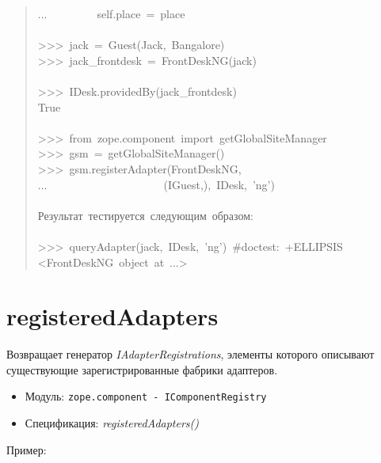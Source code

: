 \documentclass[a4paper,openany,twoside,final]{book}
\providecommand*{\DUroletitlereference}[1]{\textsl{#1}}
\begin{document}
\begin{quote}
{...~~~~~~~~~self.place~=~place\\
~\\
>{}>{}>~jack~=~Guest(\textquotedbl{}Jack\textquotedbl{},~\textquotedbl{}Bangalore\textquotedbl{})\\
>{}>{}>~jack\_frontdesk~=~FrontDeskNG(jack)\\
~\\
>{}>{}>~IDesk.providedBy(jack\_frontdesk)\\
True\\
~\\
>{}>{}>~from~zope.component~import~getGlobalSiteManager\\
>{}>{}>~gsm~=~getGlobalSiteManager()\\
>{}>{}>~gsm.registerAdapter(FrontDeskNG,\\
...~~~~~~~~~~~~~~~~~~~~~(IGuest,),~IDesk,~'ng')\\
~\\
Результат~тестируется~следующим~образом:\\
~\\
>{}>{}>~queryAdapter(jack,~IDesk,~'ng')~\#doctest:~+ELLIPSIS\\
<FrontDeskNG~object~at~...>
}
\end{quote}


\section*{registeredAdapters%
  \label{registeredadapters}%
}

Возвращает генератор \DUroletitlereference{IAdapterRegistrations}, элементы которого
описывают существующие зарегистрированные фабрики адаптеров.

\begin{itemize}

\item Модуль: \texttt{zope.component - IComponentRegistry}

\item Спецификация: \DUroletitlereference{registeredAdapters()}

\end{itemize}

Пример:
\end{document}
